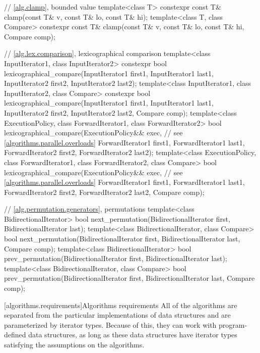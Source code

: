 \begin{codeblock}
{  // \ref{alg.clamp}, bounded value
  template<class T>
    constexpr const T& clamp(const T& v, const T& lo, const T& hi);
  template<class T, class Compare>
    constexpr const T& clamp(const T& v, const T& lo, const T& hi, Compare comp);

  // \ref{alg.lex.comparison}, lexicographical comparison
  template<class InputIterator1, class InputIterator2>
    constexpr bool
      lexicographical_compare(InputIterator1 first1, InputIterator1 last1,
                              InputIterator2 first2, InputIterator2 last2);
  template<class InputIterator1, class InputIterator2, class Compare>
    constexpr bool
      lexicographical_compare(InputIterator1 first1, InputIterator1 last1,
                              InputIterator2 first2, InputIterator2 last2,
                              Compare comp);
  template<class ExecutionPolicy, class ForwardIterator1, class ForwardIterator2>
    bool
      lexicographical_compare(ExecutionPolicy&& exec, // see \ref{algorithms.parallel.overloads}
                              ForwardIterator1 first1, ForwardIterator1 last1,
                              ForwardIterator2 first2, ForwardIterator2 last2);
  template<class ExecutionPolicy, class ForwardIterator1, class ForwardIterator2,
           class Compare>
    bool
      lexicographical_compare(ExecutionPolicy&& exec, // see \ref{algorithms.parallel.overloads}
                              ForwardIterator1 first1, ForwardIterator1 last1,
                              ForwardIterator2 first2, ForwardIterator2 last2,
                              Compare comp);

  // \ref{alg.permutation.generators}, permutations
  template<class BidirectionalIterator>
    bool next_permutation(BidirectionalIterator first,
                          BidirectionalIterator last);
  template<class BidirectionalIterator, class Compare>
    bool next_permutation(BidirectionalIterator first,
                          BidirectionalIterator last, Compare comp);
  template<class BidirectionalIterator>
    bool prev_permutation(BidirectionalIterator first,
                          BidirectionalIterator last);
  template<class BidirectionalIterator, class Compare>
    bool prev_permutation(BidirectionalIterator first,
                          BidirectionalIterator last, Compare comp);
}
\end{codeblock}

[algorithms.requirements]{Algorithms requirements}
\pnum
All of the algorithms are separated from the particular implementations of data structures and are
parameterized by iterator types.
Because of this, they can work with program-defined data structures, as long
as these data structures have iterator types satisfying the assumptions on the algorithms.


